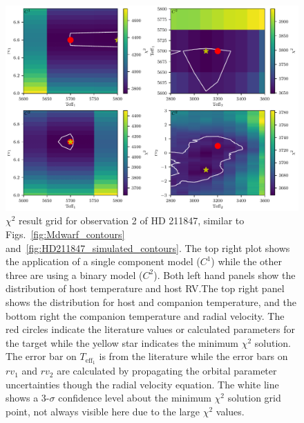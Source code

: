 \documentclass[fleqn,usenatbib]{mnras}
\begin{document}
\begin{figure}
    \centering
    \includegraphics[width=0.8\hsize]{images/fig5.pdf}
    \caption{\(\chi^2\) result grid for observation 2 of {HD 211847}, similar to Figs.~\ref{fig:Mdwarf_contours} and~\ref{fig:HD211847_simulated_contours}. The top right plot shows the application of a single component model (\(C^1\)) while the other three are using a binary model (\(C^2\)). Both left hand panels show the distribution of host temperature and host RV.\@ The top right panel shows the distribution for host and companion temperature, and the bottom right the companion temperature and radial velocity. The red circles indicate the literature values or calculated parameters for the target while the yellow star indicates the minimum \(\chi^2\) solution. The error bar on \(T_{\textrm{eff}_1}\) is from the literature while the error bars on \({rv}_1\) and \({rv}_2\) are calculated by propagating the orbital parameter uncertainties though the radial velocity equation. The white line shows a 3-\(\sigma\) confidence level about the minimum \(\chi^2\) solution grid point, not always visible here due to the large \(\chi^2\) values.}
    \label{fig:HD211847_result_contours}
\end{figure}
\end{document}
